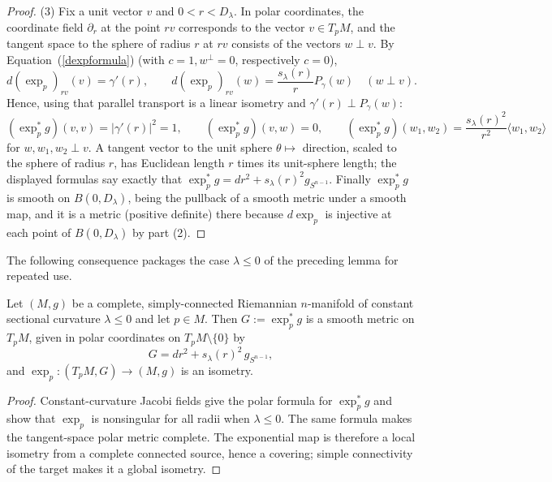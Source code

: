 \begin{proof}
(3) Fix a unit vector $v$ and $0<r<D_\lambda$. In polar coordinates,
the coordinate field $\partial_r$ at the point $rv$ corresponds to
the vector $v\in T_pM$, and the tangent space to the sphere of
radius $r$ at $rv$ consists of the vectors $w\perp v$. By
Equation~(\ref{dexpformula}) (with $c=1,w^\perp=0$, respectively
$c=0$),
$$d(\exp_p)_{rv}(v)=\gamma'(r),\qquad
d(\exp_p)_{rv}(w)=\frac{s_\lambda(r)}{r}P_\gamma(w)\quad (w\perp
v).$$
Hence, using that parallel transport is a linear isometry and
$\gamma'(r)\perp P_\gamma(w)$:
$$(\exp_p^*g)(v,v)=|\gamma'(r)|^2=1,\qquad
(\exp_p^*g)(v,w)=0,\qquad
(\exp_p^*g)(w_1,w_2)
=\frac{s_\lambda(r)^2}{r^2}\langle w_1,w_2\rangle$$
for $w,w_1,w_2\perp v$. A tangent vector to the unit sphere
$\theta\mapsto$ direction, scaled to the sphere of radius $r$, has
Euclidean length $r$ times its unit-sphere length; the displayed
formulas say exactly that
$\exp_p^*g=dr^2+s_\lambda(r)^2g_{S^{n-1}}$. Finally $\exp_p^*g$ is
smooth on $B(0,D_\lambda)$, being the pullback of a smooth metric
under a smooth map, and it is a metric (positive definite) there
because $d\exp_p$ is injective at each point of $B(0,D_\lambda)$ by
part (2).
\end{proof}

The following consequence packages the case $\lambda\le0$ of the
preceding lemma for repeated use.

\begin{lemma}
\label{lem:model-polar-isometry}

Let $(M,g)$ be a complete, simply-connected Riemannian $n$-manifold
of constant sectional curvature $\lambda\le0$ and let $p\in M$.
Then $G:=\exp_p^*g$ is a smooth metric on $T_pM$, given in
polar coordinates on $T_pM\setminus\{0\}$ by
$$G=dr^2+s_\lambda(r)^2\,g_{S^{n-1}},$$
and $\exp_p\colon(T_pM,G)\to(M,g)$ is an isometry.
\end{lemma}

\begin{proof}
\sketch
{}
Constant-curvature Jacobi fields give the polar formula for $\exp_p^*g$ and show that $\exp_p$ is nonsingular for all radii when $\lambda\le0$. The same formula makes the tangent-space polar metric complete. The exponential map is therefore a local isometry from a complete connected source, hence a covering; simple connectivity of the target makes it a global isometry.
\end{proof}

